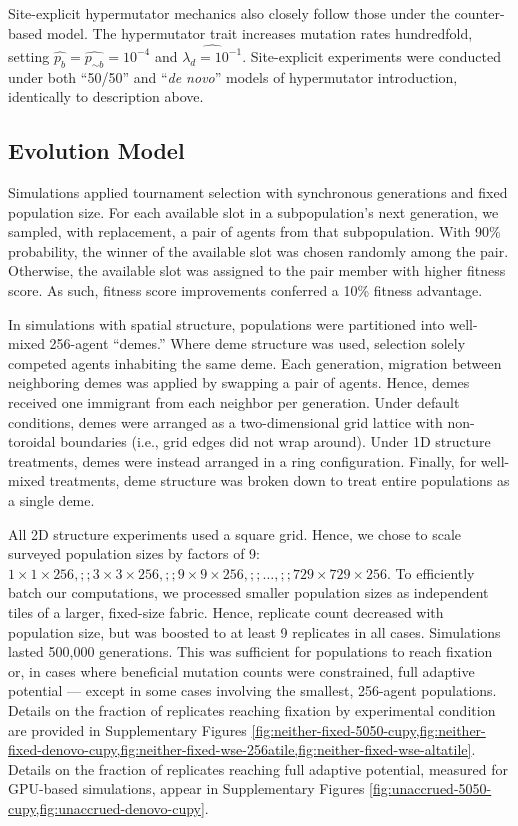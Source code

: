 Site-explicit hypermutator mechanics also closely follow those under the counter-based model.
The hypermutator trait increases mutation rates hundredfold, setting $\hat{p_{b}} = \hat{p_{\sim b}} = 10^{-4}$ and $\hat{\lambda_d=10^{-1}}$.
Site-explicit experiments were conducted under both ``50/50'' and ``\textit{de novo}'' models of hypermutator introduction, identically to description above.

\subsection{Evolution Model} \label{sec:evolution}

Simulations applied tournament selection with synchronous generations and fixed population size.
For each available slot in a subpopulation's next generation, we sampled, with replacement, a pair of agents from that subpopulation.
With 90\% probability, the winner of the available slot was chosen randomly among the pair.
Otherwise, the available slot was assigned to the pair member with higher fitness score.
As such, fitness score improvements conferred a 10\% fitness advantage.

In simulations with spatial structure, populations were partitioned into well-mixed 256-agent ``demes.''
Where deme structure was used, selection solely competed agents inhabiting the same deme.
Each generation, migration between neighboring demes was applied by swapping a pair of agents.
Hence, demes received one immigrant from each neighbor per generation.
Under default conditions, demes were arranged as a two-dimensional grid lattice with non-toroidal boundaries (i.e., grid edges did not wrap around).
Under 1D structure treatments, demes were instead arranged in a ring configuration.
Finally, for well-mixed treatments, deme structure was broken down to treat entire populations as a single deme.

All 2D structure experiments used a square grid.
Hence, we chose to scale surveyed population sizes by factors of 9: $1 \times 1 \times 256,;; 3 \times 3 \times 256,;; 9 \times 9 \times 256,;; \ldots,;; 729 \times 729 \times 256$.
To efficiently batch our computations, we processed smaller population sizes as independent tiles of a larger, fixed-size fabric.
Hence, replicate count decreased with population size, but was boosted to at least 9 replicates in all cases.
Simulations lasted 500,000 generations.
This was sufficient for populations to reach fixation or, in cases where beneficial mutation counts were constrained, full adaptive potential --- except in some cases involving the smallest, 256-agent populations.
Details on the fraction of replicates reaching fixation by experimental condition are provided in Supplementary Figures \cref{fig:neither-fixed-5050-cupy,fig:neither-fixed-denovo-cupy,fig:neither-fixed-wse-256atile,fig:neither-fixed-wse-altatile}.
Details on the fraction of replicates reaching full adaptive potential, measured for GPU-based simulations, appear in Supplementary Figures \cref{fig:unaccrued-5050-cupy,fig:unaccrued-denovo-cupy}.

